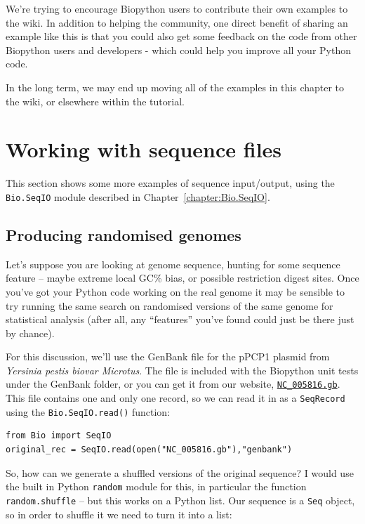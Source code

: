 \documentclass{report}
\begin{document}
We're trying to encourage Biopython users to contribute their own examples
to the wiki. In addition to helping the community, one direct benefit of
sharing an example like this is that you could also get some feedback on
the code from other Biopython users and developers - which could help you
improve all your Python code.

In the long term, we may end up moving all of the examples in this chapter
to the wiki, or elsewhere within the tutorial.

\section{Working with sequence files}
\label{seq:cookbook-sequences}

This section shows some more examples of sequence input/output, using the
\verb|Bio.SeqIO| module described in Chapter~\ref{chapter:Bio.SeqIO}.

\subsection{Producing randomised genomes}

Let's suppose you are looking at genome sequence, hunting for some sequence
feature -- maybe extreme local GC\% bias, or possible restriction digest sites.
Once you've got your Python code working on the real genome it may be sensible
to try running the same search on randomised versions of the same genome for
statistical analysis (after all, any ``features'' you've found could just be
there just by chance).

For this discussion, we'll use the GenBank file for the pPCP1 plasmid from
\textit{Yersinia pestis biovar Microtus}.  The file is included with the
Biopython unit tests under the GenBank folder, or you can get it from our
website, \href{http://biopython.org/SRC/biopython/Tests/GenBank/NC_005816.gb}
{\texttt{NC\_005816.gb}}.  
This file contains one and only one record, so we can read it in as a
\verb|SeqRecord| using the \verb|Bio.SeqIO.read()| function:

\begin{verbatim}
from Bio import SeqIO
original_rec = SeqIO.read(open("NC_005816.gb"),"genbank")
\end{verbatim}

So, how can we generate a shuffled versions of the original sequence?  I would
use the built in Python \verb|random| module for this, in particular the function
\verb|random.shuffle| -- but this works on a Python list.  Our sequence is a
\verb|Seq| object, so in order to shuffle it we need to turn it into a list:
\end{document}
